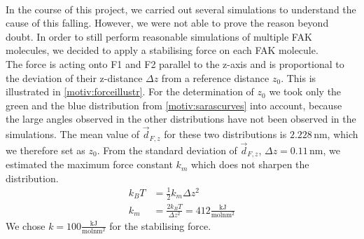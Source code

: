\\
In the course of this project, we carried out several simulations to understand the cause of this falling. However, we were not able to prove the reason beyond doubt. In order to still perform reasonable simulations of multiple FAK molecules, we decided to apply a stabilising force on each FAK molecule.\\
The force is acting onto F1 and F2 parallel to the z-axis and is proportional to the deviation of their z-distance $\Delta z$ from a reference distance $z_0$. This is illustrated in \autoref{motiv:forceillustr}. For the determination of $z_0$ we took only the green and the blue distribution from \autoref{motiv:sarascurves} into account, because the large angles observed in the other distributions have not been observed in the \charmm{} simulations. The mean value of $\vec{d}_{F, z}$ for these two distributions is $2.228\,\si{\nano\metre}$, which we therefore set as $z_0$. From the standard deviation of $\vec{d}_{F, z}$, $\Delta z = 0.11\,\si{\nano\metre}$, we estimated the maximum force constant $k_m$ which does not sharpen the distribution.
\begin{align}
	k_B T &= \frac{1}{2} k_m \Delta z^2\\
	k_m &= \frac{2 k_B T}{\Delta z^2} = 412 \frac{\si{\kilo\joule}}{\si{\mole} \si{\nano\metre}^2}
\end{align} 
We chose $k = 100 \frac{\si{\kilo\joule}}{\si{\mole} \si{\nano\metre}^2}$ for the stabilising force.
%
%
%
